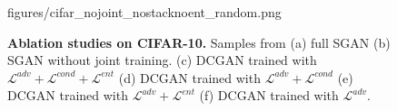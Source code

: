 \documentclass[10pt,twocolumn,letterpaper]{article}
\begin{document}
\begin{figure}[!tbp]
{        {figures/cifar_nojoint_nostacknoent_random.png}}        
 	\caption{{\bf Ablation studies on CIFAR-10.} Samples from (a) full SGAN (b) SGAN without joint training. (c) DCGAN trained with $\mathcal{L}^{adv}+\mathcal{L}^{cond}+\mathcal{L}^{ent}$ (d) DCGAN trained with $\mathcal{L}^{adv}+\mathcal{L}^{cond}$ (e) DCGAN trained with $\mathcal{L}^{adv}+\mathcal{L}^{ent}$ (f) DCGAN trained with $\mathcal{L}^{adv}$. } 
 	\label{fig:ablation}
 	 \vspace{-0.2cm}
 \end{figure}
\end{document}
